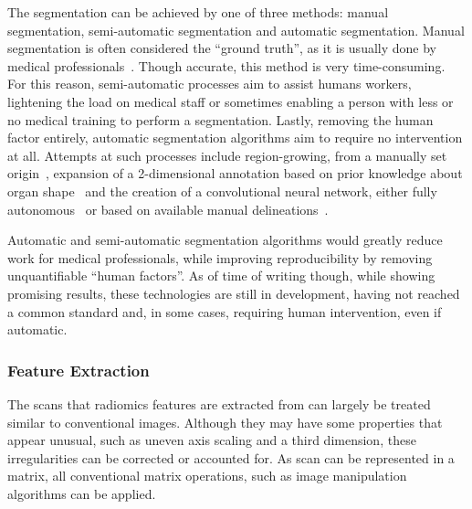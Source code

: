 The segmentation can be achieved by one of three methods: manual segmentation,
semi-automatic segmentation and automatic segmentation. Manual segmentation is
often considered the \enquote{ground truth}, as it is usually done by medical
professionals~\cite{auto_and_semiauto}. Though accurate, this method is very 
time-consuming. For this reason, semi-automatic processes aim to assist humans 
workers, lightening the load on medical staff or sometimes enabling a person 
with less or no medical training to perform a segmentation\cite{auto_and_semiauto}.
Lastly, removing the human factor entirely, automatic segmentation algorithms 
aim to require no intervention at all. Attempts at such processes include 
region-growing, from a manually set origin~\cite{auto_and_semiauto}, expansion
of a 2-dimensional annotation based on prior knowledge about organ 
shape~\cite{semiautomatic_prostate} and the creation of a convolutional neural network,
either fully autonomous~\cite{dl_rectal_segmentation} or based on available manual delineations~\cite{u-net_auto_anno}.

Automatic and semi-automatic segmentation algorithms would greatly 
reduce work for medical professionals, while improving reproducibility by 
removing unquantifiable \enquote{human factors}. As of time of writing though,
while showing promising results, 
these technologies are still in development, having not reached a common 
standard and, in some cases, requiring human intervention, even if automatic\cite{auto_and_semiauto,dl_rectal_segmentation}.


\subsubsection{Feature Extraction}\label{sec:radiomics_feature_extraction}


The scans that radiomics features are extracted from can largely be treated 
similar to conventional images. Although they may have some properties that 
appear unusual, such as uneven axis scaling and a third dimension, these 
irregularities can be corrected or accounted for. As  scan can be 
represented in a matrix, all conventional matrix operations, such as image 
manipulation algorithms can be applied. 

